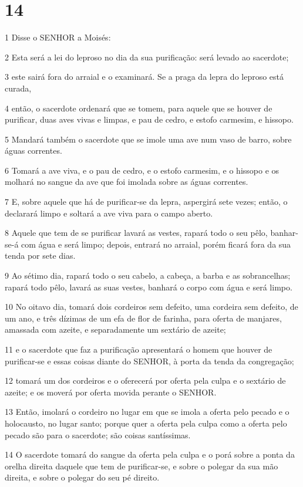 \chapter{14}

\par 1 Disse o SENHOR a Moisés:
\par 2 Esta será a lei do leproso no dia da sua purificação: será levado ao sacerdote;
\par 3 este sairá fora do arraial e o examinará. Se a praga da lepra do leproso está curada,
\par 4 então, o sacerdote ordenará que se tomem, para aquele que se houver de purificar, duas aves vivas e limpas, e pau de cedro, e estofo carmesim, e hissopo.
\par 5 Mandará também o sacerdote que se imole uma ave num vaso de barro, sobre águas correntes.
\par 6 Tomará a ave viva, e o pau de cedro, e o estofo carmesim, e o hissopo e os molhará no sangue da ave que foi imolada sobre as águas correntes.
\par 7 E, sobre aquele que há de purificar-se da lepra, aspergirá sete vezes; então, o declarará limpo e soltará a ave viva para o campo aberto.
\par 8 Aquele que tem de se purificar lavará as vestes, rapará todo o seu pêlo, banhar-se-á com água e será limpo; depois, entrará no arraial, porém ficará fora da sua tenda por sete dias.
\par 9 Ao sétimo dia, rapará todo o seu cabelo, a cabeça, a barba e as sobrancelhas; rapará todo pêlo, lavará as suas vestes, banhará o corpo com água e será limpo.
\par 10 No oitavo dia, tomará dois cordeiros sem defeito, uma cordeira sem defeito, de um ano, e três dízimas de um efa de flor de farinha, para oferta de manjares, amassada com azeite, e separadamente um sextário de azeite;
\par 11 e o sacerdote que faz a purificação apresentará o homem que houver de purificar-se e essas coisas diante do SENHOR, à porta da tenda da congregação;
\par 12 tomará um dos cordeiros e o oferecerá por oferta pela culpa e o sextário de azeite; e os moverá por oferta movida perante o SENHOR.
\par 13 Então, imolará o cordeiro no lugar em que se imola a oferta pelo pecado e o holocausto, no lugar santo; porque quer a oferta pela culpa como a oferta pelo pecado são para o sacerdote; são coisas santíssimas.
\par 14 O sacerdote tomará do sangue da oferta pela culpa e o porá sobre a ponta da orelha direita daquele que tem de purificar-se, e sobre o polegar da sua mão direita, e sobre o polegar do seu pé direito.
